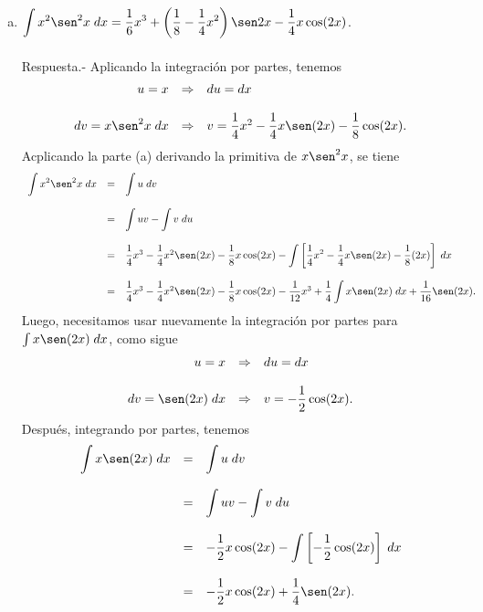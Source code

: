 \begin{enumerate}[\bfseries 1.]
\begin{enumerate}[(a)]
	    \item $\displaystyle\int x^2\sen^2 x \; dx = \dfrac{1}{6}x^3 + \left(\dfrac{1}{8}-\dfrac{1}{4}x^2\right)\sen 2x - \dfrac{1}{4} x\cos (2x)$.\\\\
		Respuesta.-\; Aplicando la integración por partes, tenemos
		$$
		\begin{array}{rcl}
		    u=x&\Rightarrow&du=dx\\\\
		    dv=x\sen^2 x\; dx &\Rightarrow&v=\dfrac{1}{4}x^2-\dfrac{1}{4}x\sen(2x)-\dfrac{1}{8}\cos(2x).
		\end{array}
		$$
		Acplicando la parte (a) derivando la primitiva de $x\sen^2 x$, se tiene
		$$
		\begin{array}{rcl}
		    \displaystyle\int x^2\sen^2 x\; dx&=&\displaystyle\int u\; dv\\\\
				    &=&\displaystyle\int uv - \int v\; du\\\\
				    &=&\dfrac{1}{4}x^3 - \dfrac{1}{4}x^2 \sen(2x)-\dfrac{1}{8}x\cos(2x)-\displaystyle\int \left[\dfrac{1}{4}x^2-\dfrac{1}{4}x\sen(2x)-\dfrac{1}{8}(2x)\right]\; dx\\\\
				    &=&\dfrac{1}{4}x^3-\dfrac{1}{4}x^2 \sen(2x)-\dfrac{1}{8}x\cos(2x)-\dfrac{1}{12}x^3+\dfrac{1}{4}\displaystyle\int x\sen(2x)\; dx+\dfrac{1}{16}\sen(2x).
		\end{array}
		$$
		Luego, necesitamos usar nuevamente la integración por partes para $\int x\sen(2x)\; dx$, como sigue
		$$
		\begin{array}{rcl}
		    u=x&\Rightarrow&du=dx\\\\
		    dv=\sen(2x)\; dx &\Rightarrow&v=-\dfrac{1}{2}\cos(2x).
		\end{array}
		$$
		Después, integrando por partes, tenemos
		$$
		\begin{array}{rcl}
		    \displaystyle\int x\sen(2x)\; dx&=&\displaystyle\int u\; dv\\\\
				    &=&\displaystyle\int uv - \int v\; du\\\\
				    &=&-\dfrac{1}{2}x\cos(2x)-\displaystyle\int\left[-\dfrac{1}{2}\cos(2x)\right]\; dx\\\\
				    &=&-\dfrac{1}{2}x\cos(2x)+\dfrac{1}{4}\sen(2x).
		\end{array}
$$
\end{enumerate}
\end{enumerate}
